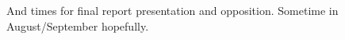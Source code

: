 \documentclass{scrartcl}
\begin{document}
And times for final report presentation and opposition.
Sometime in August/September hopefully.













\end{document}

